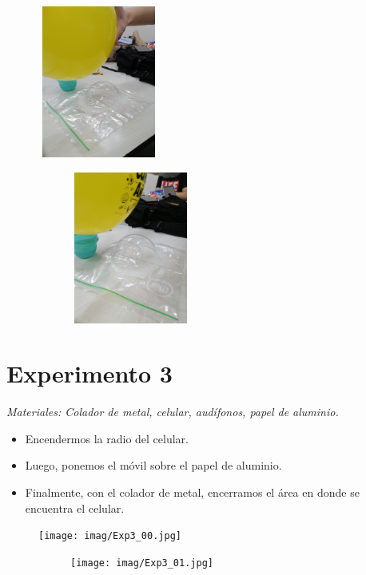 \documentclass[a4paper,12pt]{article}
\begin{document}
\begin{figure}[h!]
    \begin{subfigure}
        \raggedright
        \includegraphics[width=4cm, height=5cm]{imag/Exp2_03.jpg}
    \end{subfigure}
    \begin{subfigure}
        \centering
        \includegraphics[width=4cm, height=5cm]{imag/Exp2_04.jpg}
    \end{subfigure}
\end{figure}
\newpage
\section*{Experimento 3}
\textit{Materiales: Colador de metal, celular, audífonos, papel de aluminio.}
    \begin{itemize}
        \item Encendermos la radio del celular.
        \item Luego, ponemos el móvil sobre el papel de aluminio.
        \item Finalmente, con el colador de metal, encerramos el área en donde se encuentra el celular.
    \end{itemize}

\begin{figure}[h!]
    \begin{subfigure}
        \raggedright
        \texttt{[image: imag/Exp3\_00.jpg]}
    \end{subfigure}
    \begin{subfigure}
        \centering
        \texttt{[image: imag/Exp3\_01.jpg]}
    \end{subfigure}
\end{figure}



\end{document}
